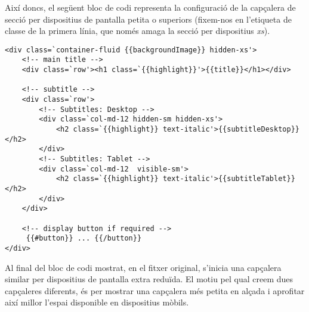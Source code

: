     Així doncs, el següent bloc de codi representa la configuració de la capçalera de secció per dispositius de pantalla petita o superiors (fixem-nos en l'etiqueta de classe de la primera línia, que només amaga la secció per dispositius \emph{xs}).

    \begin{lstlisting}[style=rawOwn,caption={Posicionament de paràmetres amb Mustache en el HTML}]
<div class=`container-fluid {{backgroundImage}} hidden-xs'>
	<!-- main title -->
	<div class=`row'><h1 class=`{{highlight}}'>{{title}}</h1></div>

	<!-- subtitle -->
	<div class=`row'>
		<!-- Subtitles: Desktop -->
		<div class=`col-md-12 hidden-sm hidden-xs'>
			<h2 class=`{{highlight}} text-italic'>{{subtitleDesktop}}</h2>
		</div>
		<!-- Subtitles: Tablet -->
		<div class=`col-md-12  visible-sm'>
			<h2 class=`{{highlight}} text-italic'>{{subtitleTablet}}</h2>
		</div>
	</div>

	<!-- display button if required -->
	 {{#button}} ... {{/button}}
</div>
    \end{lstlisting}

    Al final del bloc de codi mostrat, en el fitxer original, s'inicia una capçalera similar per dispositius de pantalla extra reduïda. El motiu pel qual creem dues capçaleres diferents, és per mostrar una capçalera més petita en alçada i aprofitar així millor l'espai disponible en dispositius mòbils.
